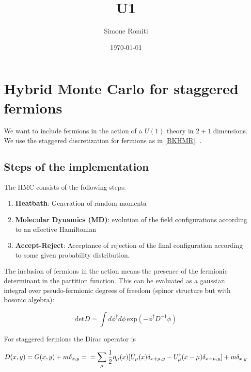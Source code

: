 \documentclass[12pt, a4paper]{article}
\title{U1}
\author{Simone Romiti}
\date{\today}
\begin{document}
\newcommand{\HMCref}{
\href{https://www.sciencedirect.com/science/article/pii/0550321389903246}{[BKHMR]}.
}

\newcommand{\GLref}{
\href{https://link.springer.com/book/10.1007/978-3-642-01850-3}{[GL]}.
}




\maketitle

\section{Hybrid Monte Carlo for staggered fermions}

We want to include fermions in the action of a $U(1)$ theory in $2+1$ dimensions. We use the staggered discretization for fermions as in \HMCref{}.

\subsection{Steps of the implementation}

The HMC consists of the following steps:

\begin{enumerate}
    \item 
    \textbf{Heatbath}: Generation of random momenta
    \item 
    \textbf{Molecular Dynamics (MD)}: evolution of the field configurations according to an effective Hamiltonian
    \item
    \textbf{Accept-Reject}: Acceptance of rejection of the final configuration according to some given probability distribution.
\end{enumerate}
%
The inclusion of fermions in the action means the presence of the fermionic determinant in the partition function. This can be evaluated as a gaussian integral over pseudo-fermionic degrees of freedom (spinor structure but with bosonic algebra):

\begin{equation}
\text{det} D = 
\int d \phi^{\dagger} d \phi 
\, \text{exp}(-\phi^{\dagger} D^{-1} \phi)
\end{equation}

For staggered fermions the Dirac operator is

$$
D(x,y) = G(x,y) + m \delta_{x,y} = \\ 
=  \sum_{\mu} \frac{1}{2} \eta_{\mu}(x) 
    [U_{\mu}(x) \delta_{x+\mu, y} -
     U^{\dagger}_{\mu}(x-\mu) \delta_{x-\mu, y} ]
+ m \delta_{x, y}
$$
\end{document}
